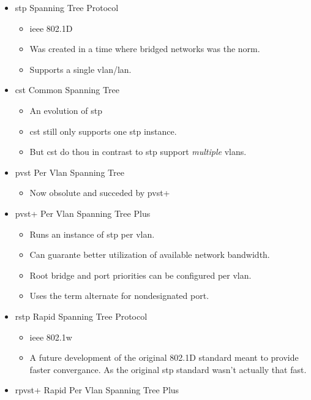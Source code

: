 \begin{itemize}
    \item \gls{stp} {\scriptsize Spanning Tree Protocol}
    \begin{itemize}
        \item \gls{ieee} 802.1D
        \item Was created in a time where bridged networks was the norm.
        \item Supports a single vlan/lan.
    \end{itemize}
    \item \gls{cst} {\scriptsize Common Spanning Tree}
    \begin{itemize}
        \item An evolution of \gls{stp}
        \item \gls{cst} still only supports one \gls{stp} instance.
        \item But \gls{cst} do thou in contrast to \gls{stp} support \textit{multiple} vlans.
    \end{itemize}
    \item \gls{pvst} {\scriptsize Per Vlan Spanning Tree}
    \begin{itemize}
        \item Now obsolute and succeded by \gls{pvst+}
    \end{itemize}
    \item \gls{pvst+} {\scriptsize Per Vlan Spanning Tree Plus}
    \begin{itemize}
        \item Runs an instance of \gls{stp} per vlan.
        \item Can guarante better utilization of available network bandwidth.
        \item Root bridge and port priorities can be configured per vlan.
        \item Uses the term alternate for nondesignated port.
    \end{itemize}
    \item \gls{rstp} {\scriptsize Rapid Spanning Tree Protocol}
    \begin{itemize}
        \item \gls{ieee} 802.1w
        \item A future development of the original 802.1D standard meant to provide faster convergance. As the original \gls{stp} standard wasn't actually that fast.
    \end{itemize}
    \item \gls{rpvst+} {\scriptsize Rapid Per Vlan Spanning Tree Plus}

\end{itemize}
